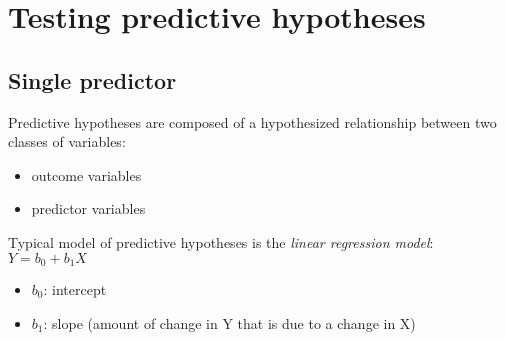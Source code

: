 \documentclass[11pt]{article}
\begin{document}
\section*{Testing predictive hypotheses}
\label{sec-3}
\subsection*{Single predictor}
\label{sec-3-1}
Predictive hypotheses are composed of a hypothesized relationship between two classes of variables:
\begin{itemize}
\item outcome variables
\item predictor variables
\end{itemize}

Typical model of predictive hypotheses is the \emph{linear regression model}: $Y=b_0+b_1X$
\begin{itemize}
\item $b_0$: intercept
\item $b_1$: slope (amount of change in Y that is due to a change in X)
\end{itemize}
\end{document}
